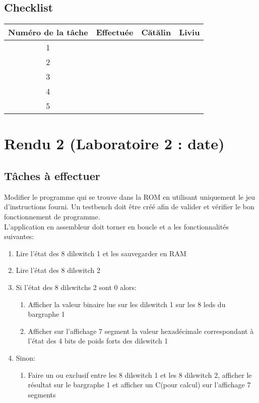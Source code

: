 \documentclass{article}
\begin{document}
    \subsection{Checklist}
    \begin{center}
        \begin{tabular}{|c|c|c|c|}
            \hline
            Numéro de la tâche & Effectuée & Cătălin & Liviu \\
            \hline
            \hline 1 &   &   &   \\ 
            \hline 2 &   &   &   \\
            \hline 3 &   &   &   \\
            \hline 4 &   &   &   \\
            \hline 5 &   &   &   \\
            \hline
        \end{tabular}
    \end{center}
    \newpage

    \section{Rendu 2 (Laboratoire 2 : date) }
    \subsection{Tâches à effectuer}
    Modifier le programme qui se trouve dans la ROM en utilisant uniquement le jeu d'instructions fourni. Un testbench doit être créé afin de valider et vérifier le bon fonctionnement de programme. \\
    L'application en assembleur doit torner en boucle et a les fonctionnalités suivantes:
    \begin{enumerate}
        \item Lire l'état des 8 dilswitch 1 et les sauvegarder en RAM
        \item Lire l'état des 8 dilswitch 2
        \item Si l'état des 8 dilswitchs 2 sont 0 alors:
        \begin{enumerate}
            \item Afficher la valeur binaire lue sur les dilswitch 1 sur les 8 leds du bargraphe 1
            \item Afficher sur l'affichage 7 segment la valeur hexadécimale correspondant à l'état des 4 bits de poids forts des dilswitch 1 
        \end{enumerate}
        \item Sinon:
        \begin{enumerate}
            \item Faire un ou exclusif entre les 8 dilswitch 1 et les 8 dilswitch 2, afficher le résultat sur le bargraphe 1 et afficher un C(pour calcul) sur l'affichage 7 segments
        \end{enumerate}
    \end{enumerate}
\end{document}
